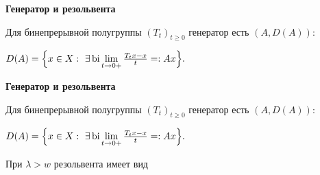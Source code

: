 \documentclass[11pt]{article}
\begin{document}
\newpage

\begin{center}
{\color{notaeYELLOW}\bfseries\fontsize{44}{52}\selectfont Генератор и резольвента}
\end{center}
\vspace*{\fill}
\begin{center}
\fontsize{36}{43}\selectfont
\parbox{\linewidth}{\centering\noindent Для бинепрерывной полугруппы $(T_t)_{t\ge0}$ генератор есть $(A,D(A))$:
\par}\vspace{0.4in}
\parbox{\linewidth}{\centering\noindent $D(A)=\Bigl\{x\in X:\ \exists\operatorname{bi}\lim\limits_{t\to0+}\frac{T_t x-x}{t}=:Ax\Bigr\}.$
\par}\vspace{0.4in}
\end{center}
\vspace*{\fill}

\newpage

\begin{center}
{\color{notaeYELLOW}\bfseries\fontsize{44}{52}\selectfont Генератор и резольвента}
\end{center}
\vspace*{\fill}
\begin{center}
\fontsize{36}{43}\selectfont
\parbox{\linewidth}{\centering\noindent Для бинепрерывной полугруппы $(T_t)_{t\ge0}$ генератор есть $(A,D(A))$:
\par}\vspace{0.4in}
\parbox{\linewidth}{\centering\noindent $D(A)=\Bigl\{x\in X:\ \exists\operatorname{bi}\lim\limits_{t\to0+}\frac{T_t x-x}{t}=:Ax\Bigr\}.$
\par}\vspace{0.4in}
\parbox{\linewidth}{\centering\noindent При $\lambda>w$ резольвента имеет вид
\par}\vspace{0.4in}
\end{center}
\vspace*{\fill}

\newpage
\end{document}
